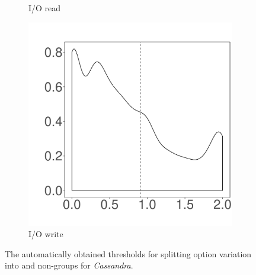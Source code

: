\documentclass[10pt,journal,compsoc]{IEEEtran}
\begin{document}
\begin{figure}
\begin{subfigure}{0.19\textwidth}
                \caption{I/O read}
        \end{subfigure}
        \begin{subfigure}{0.19\textwidth}
                \includegraphics[width=\linewidth]{Figures/iowrite-cassandra-cluster.pdf}
                \caption{I/O write}
        \end{subfigure}
        
	\caption{The automatically obtained thresholds for splitting option variation into \inconsistent and non-\inconsistent groups for \emph{Cassandra}.} %
	
	\label{fig:threshold\_cassandra}
\end{figure}
\end{document}
